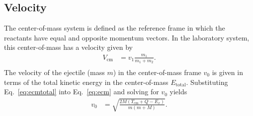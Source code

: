\subsection{Velocity}
The center-of-mass system is defined as the reference frame in which the reactants have equal and opposite momentum vectors.
In the laboratory system, this center-of-mass has a velocity %
given by
\begin{equation}
\begin{split}
V_\mathrm{cm}&=v_{1}\frac{m_{1}}{m_{1}+m_{2}}.\\
\end{split}
\label{Vcm}
\end{equation}
The velocity of the ejectile (mass $m$) in the center-of-mass frame $v_0$ is given in terms of the total kinetic energy in the center-of-mass $E_\textrm{total}$.  Substituting Eq.~\ref{eq:ecmtotal} into Eq.~\ref{eq:ecm} and solving for $v_0$ yields
\begin{equation}
\begin{split}
v_0%
&=\sqrt{\frac{2M(T_\mathrm{cm}+Q-E_x)}{m(m+M)}}.
\end{split}
\label{kin_v0}
\end{equation}

